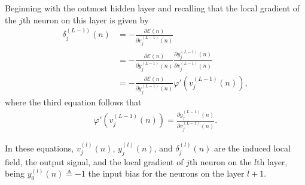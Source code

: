 \documentclass[12pt,a4paper]{article}
\begin{document}
Beginning with the outmost hidden layer and recalling that the local gradient of the \(j\)th neuron on this layer is given by
\begin{align}
    \delta_j^{(L-1)} (n) & = - \frac{\partial \mathscr{E}(n)}{\partial v_{j}^{(L-1)}(n)} \nonumber \\
    & = - \frac{\partial \mathscr{E}(n)}{\partial y_{j}^{(L-1)}(n)} \frac{\partial y_{j}^{(L-1)}(n)}{\partial v_{j}^{(L-1)}(n)} \nonumber \nonumber \\
    & = - \frac{\partial \mathscr{E}(n)}{\partial y_{j}^{(L-1)}(n)} \varphi'(v_j^{(L-1)}(n)),
    \label{eq:local-gradient2}
\end{align}
where the third equation follows that
\begin{align}
    \varphi'(v_j^{(L-1)}(n)) = \frac{\partial y_{j}^{(L-1)}(n)}{\partial v_{j}^{(L-1)}(n)}.
\end{align}

In these equations, \(v_{j}^{(l)}(n)\), \(y_{j}^{(l)} (n)\), and \(\delta_j^{(l)} (n)\) are the induced local field, the output signal, and the local gradient of \(j\)th neuron on the \(l\)th layer, being \(y_{0}^{(l)} (n) \triangleq -1\) the input bias for the neurons on the layer \(l+1\).
\end{document}
